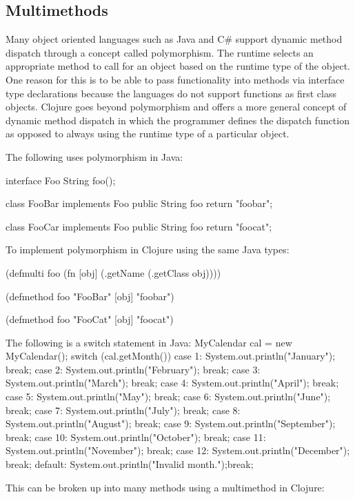 \subsection{Multimethods}
Many object oriented languages such as Java and C\# support dynamic method dispatch through a concept called polymorphism. The runtime selects an appropriate method to call for an object based on the runtime type of the object. One reason for this is to be able to pass functionality into methods via interface type declarations because the languages do not support functions as first class objects. 
Clojure goes beyond polymorphism and offers a more general concept of dynamic method dispatch in which the programmer defines
the dispatch function as opposed to always using the runtime type of a particular object. 

The following uses polymorphism in Java:

interface Foo { 
	String foo(); 
}

class FooBar implements Foo {
        public String foo { return "foobar"; }
}

class FooCar implements Foo {
        public String foo { return "foocat"; }
}

To implement polymorphism in Clojure using the same Java types:

(defmulti foo (fn [obj] (.getName (.getClass obj))))

(defmethod foo "FooBar" [obj] "foobar")

(defmethod foo "FooCat" [obj] "foocat")

The following is a switch statement in Java:
MyCalendar cal = new MyCalendar();
switch (cal.getMonth()) {
            case 1:  System.out.println("January"); break;
            case 2:  System.out.println("February"); break;
            case 3:  System.out.println("March"); break;
            case 4:  System.out.println("April"); break;
            case 5:  System.out.println("May"); break;
            case 6:  System.out.println("June"); break;
            case 7:  System.out.println("July"); break;
            case 8:  System.out.println("August"); break;
            case 9:  System.out.println("September"); break;
            case 10: System.out.println("October"); break;
            case 11: System.out.println("November"); break;
            case 12: System.out.println("December"); break;
            default: System.out.println("Invalid month.");break;
        }

This can be broken up into many methods using a multimethod in Clojure:

